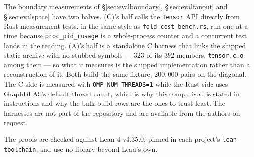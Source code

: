 \documentclass[11pt,a4paper]{article}
\theoremstyle{plain}
\theoremstyle{definition}
\theoremstyle{remark}
\begin{document}
The boundary measurements of \S\ref{sec:evalboundary},
\S\ref{sec:evalfanout} and \S\ref{sec:evalspace} have two halves. (C)'s half
calls the \texttt{Tensor} API directly from Rust measurement tests, in the same
style as \texttt{fold\_cost\_bench.rs}, run one at a time because
\texttt{proc\_pid\_rusage} is a whole-process counter and a concurrent test lands
in the reading. (A)'s half is a standalone C harness that links the shipped
static archive with no stubbed symbols --- $323$ of its $392$ members,
\texttt{tensor.c.o} among them --- so what it measures is the shipped
implementation rather than a reconstruction of it. Both build the same
fixture, $200{,}000$ pairs on the diagonal. The C side is measured with
\texttt{OMP\_NUM\_THREADS=1} while the Rust side uses GraphBLAS's default thread
count, which is why this comparison is stated in instructions and why the
bulk-build rows are the ones to trust least. The harnesses are not part of the
repository and are available from the authors on request.

The proofs are checked against Lean 4 v4.35.0, pinned in each project's
\texttt{lean-toolchain}, and use no library beyond Lean's own.
\end{document}
